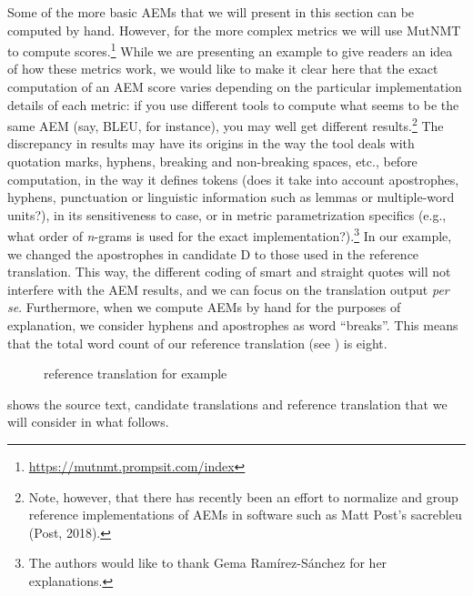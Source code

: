 \documentclass[output=paper]{langscibook}
\begin{document}
Some of the more basic AEMs that we will present in this section can be computed by hand. However, for the more complex metrics we will use MutNMT to compute scores.\footnote{\url{https://mutnmt.prompsit.com/index}} While we are presenting an example to give readers an idea of how these metrics work, we would like to make it clear here that the exact computation of an AEM score varies depending on the particular implementation details of each metric: if you use different tools to compute what seems to be the same AEM (say, BLEU, for instance), you may well get different results.\footnote{Note, however, that there has recently been an effort to normalize and group reference implementations of AEMs in software such as Matt Post's sacrebleu (Post, 2018).} The discrepancy in results may have its origins in the way the tool deals with quotation marks, hyphens, breaking and non-breaking spaces, etc., before computation, in the way it defines tokens (does it take into account apostrophes, hyphens, punctuation or linguistic information such as lemmas or multiple-word units?), in its sensitiveness to case, or in metric parametrization specifics (e.g., what order of \textit{n}{}-grams is used for the exact implementation?).\footnote{The authors would like to thank Gema Ramírez-Sánchez for her explanations.} In our example, we changed the apostrophes in candidate D to those used in the reference translation. This way, the different coding of smart and straight quotes will not interfere with the AEM results, and we can focus on the translation output \textit{per se}. Furthermore, when we compute AEMs by hand for the purposes of explanation, we consider hyphens and apostrophes as word “breaks”. This means that the total word count of our reference translation (see ) is eight.

\begin{figure}
%
\caption{reference translation for example}
\label{fig:rossi:4}
\end{figure}

 shows the source text, candidate translations and reference translation that we will consider in what follows.
\end{document}
